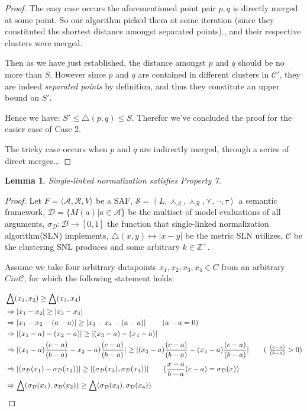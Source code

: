 \documentclass{article}
\newtheorem{lemma}{Lemma}
\newcommand{\args}{\mathcal{A}} %
\newcommand{\att}{\mathcal{R}}  %
\newcommand{\valueset}{L}
\newcommand{\safid}{F}               %
\newcommand{\saf}{\safid = \safbody} %
\newcommand{\safbody}{\langle \args, \att, V \rangle} %
\newcommand{\sembodyNew}{\left\langle \valueset,\SAFand_\mathcal{A}, \SAFand_\mathcal{R},\SAFor,\lnot,\tau \right\rangle} %
\newcommand{\SAFand}{\curlywedge}     %
\newcommand{\SAFor}{\curlyvee}        %
\newcommand{\sem}{\mathcal{S}}
\newcommand{\dataset}{\mathcal{D}}   %
\newcommand{\clusterset}{\mathcal{C}}   %
\begin{document}
\begin{proof}
The easy case occurs the aforementioned point pair $p ,q$ is directly merged at some point. So our algorithm picked them at some iteration (since they constituted the shortest distance amongst separated points)., and their respective clusters were merged.

Then as we have just established, the distance amongst $p$ and $q$ should be no more than $S$. However since $p$ and $q$ are contained in different clusters in $\clusterset'$, they are indeed \textit{separated points} by definition, and thus they constitute an upper bound on $S'$.

Hence we have: $S' \leq \bigtriangleup(p, q) \leq S$. Therefor we've concluded the proof for the easier case of Case 2.
 
The tricky case occurs when $p$ and $q$ are indirectly merged, through a series of direct merges... 
\end{proof}

\begin{lemma}
Single-linked normalization satisfies Property 7.
\end{lemma}

\begin{proof}
Let $\saf$ be a SAF, $\sem = \sembodyNew$ a semantic framework, $\dataset = \{M(a)|a \in \args$\} be the multiset of model evaluations of all arguments, $\sigma_{\dataset}: \dataset  \rightarrow  [0,1]$ the function that single-linked normalization algorithm(SLN) implements, $\bigtriangleup(x,y) \mapsto |x - y|$ be the metric SLN utilizes, $\clusterset$ be the clustering SNL produces and some arbitrary $k \in \mathbb{Z}^{+}$.

Assume we take four arbitrary datapoints  $x_1, x_2, x_3, x_4 \in C$ from an arbitrary $C in \clusterset$, for which the following statement holds:


\begin{align*}
 & \bigtriangleup(x_1, x_2) \geq \bigtriangleup(x_3, x_4)
 \\ &\Rightarrow |x_1 - x_2| \geq |x_3 - x_4|
 \\ &\Rightarrow |x_1 - x_2 - (a - a)| \geq |x_3 - x_4 - (a - a)| \>                 \tag{$a - a = 0$}
 \\ &\Rightarrow |(x_1 - a) - (x_2  - a)| \geq |(x_3  - a) - (x_4 - a)| 
\\ &\Rightarrow |(x_1 - a) \frac{(c-a)}{(b-a)} - x_2  - a) \frac{(c-a)}{(b-a)}| \geq |(x_3  - a) \frac{(c-a)}{(b-a)} - (x_4 - a) \frac{(c-a)}{(b-a)}|  \tag{ $\frac{(c-a)}{(b-a)} > 0$}
 \\&\Rightarrow  |(\sigma_{\dataset}(x_1) - \sigma_{\dataset}(x_2))| \geq |(\sigma_{\dataset}(x_3), \sigma_{\dataset}(x_4))|					\tag{$\dfrac{x-a}{b-a} (c-a)=\sigma_{\dataset}(x)$}
 \\&\Rightarrow  \bigtriangleup(\sigma_{\dataset}(x_1), \sigma_{\dataset}(x_2)) \geq \bigtriangleup(\sigma_{\dataset}(x_3), \sigma_{\dataset}(x_4))
\end{align*}
\end{proof}
\end{document}
